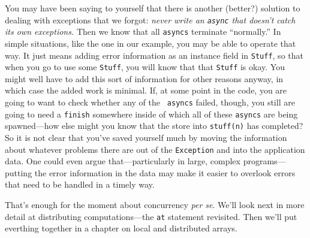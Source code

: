 You may have been saying to yourself that there is another (better?) solution to
dealing with exceptions that we forgot: {\em never write an {\tt async} that
doesn't catch its own exceptions.}  Then we know that all {\tt asyncs} terminate
``normally.''  In simple situations, like the one in our example, you may be
able to operate that way.  It just means adding error information as an instance
field in {\tt Stuff}, so that when you go to use some {\tt Stuff}, you will know
that that {\tt Stuff} is okay. You might well have to add this sort of information
for other reasons anyway, in which case the added work is minimal. If, at some
point in the code, you are going to want to check whether any of the {\tt
asyncs} failed, though, you still are going to need a {\tt finish} somewhere
inside of which all of these {\tt asyncs} are being spawned---how else might
you know that the store into {\tt stuff(n)} has completed?  So it is not clear
that you've saved yourself much by moving the information about whatever
problems there are out of the {\tt Exception} and into the application data.
One could even argue that---particularly in large, complex programs---putting
the error information in the data may make it easier to overlook errors that
need to be handled in a timely way.

That's enough for the moment about concurrency {\em per se}.  We'll look next in
more detail at distributing computations---the {\tt at} statement revisited. 
Then we'll put everthing together in a chapter on local and distributed arrays.
